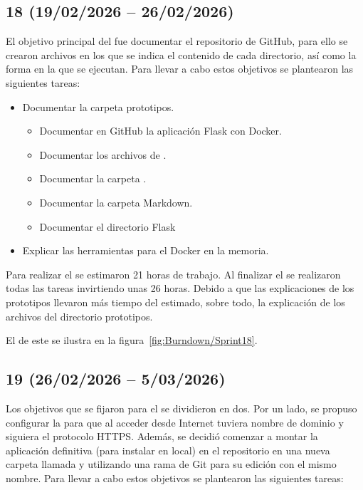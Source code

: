 \subsection{ 18 (19/02/2026 -- 26/02/2026)}
El objetivo principal del  fue documentar el repositorio de GitHub, para ello se crearon archivos  en los que se indica el contenido de cada directorio, así como la forma en la que se ejecutan. Para llevar a cabo estos objetivos se plantearon las siguientes tareas:
\begin{itemize}
\tightlist
	\item Documentar la carpeta prototipos.
		\begin{itemize}
		\tightlist
			\item Documentar en GitHub la aplicación {Flask} con Docker.
			\item Documentar los archivos de .
			\item Documentar la carpeta .
			\item Documentar la carpeta Markdown.
			\item Documentar el directorio Flask
		\end{itemize}
		\item Explicar las herramientas para el Docker en la memoria.
\end{itemize} 

Para realizar el  se estimaron 21 horas de trabajo. Al finalizar el  se realizaron todas las tareas invirtiendo unas 26 horas. Debido a que las explicaciones de los prototipos llevaron más tiempo del estimado, sobre todo, la explicación de los archivos del directorio prototipos.

El  de este  se ilustra en la figura~\ref{fig:Burndown/Sprint18}.

\subsection{ 19 (26/02/2026 -- 5/03/2026)}
Los objetivos que se fijaron para el  se dividieron en dos. Por un lado, se propuso configurar la  para que al acceder desde Internet tuviera nombre de dominio y siguiera el protocolo HTTPS. Además, se decidió comenzar a montar la aplicación definitiva (para instalar en local) en el repositorio en una nueva carpeta llamada  y utilizando una rama de Git para su edición con el mismo nombre. Para llevar a cabo estos objetivos se plantearon las siguientes tareas:

